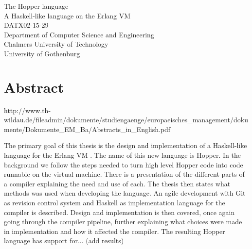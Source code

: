 The Hopper language\\
A Haskell-like language on the Erlang VM\\
DATX02-15-29\\
Department of Computer Science and Engineering\\
Chalmers University of Technology\\
University of Gothenburg\\

\thispagestyle{plain}			%
\section*{Abstract}



http://www.th-wildau.de/fileadmin/dokumente/studiengaenge/europaeisches_management/dokumente/Dokumente_EM_Ba/Abstracts_in_English.pdf






The primary goal of this thesis is the design and implementation of a Haskell-like language for the Erlang VM . The name of this new language is Hopper.
In the background we follow the steps needed to turn high level Hopper code into code runnable on the virtual machine. There is a presentation of the different parts of a compiler explaining the need and use of each. The thesis then states what methods was used when developing the language. An agile development with Git as revision control system and Haskell as implementation language for the compiler is described. Design and implementation is then covered, once again going through the compiler pipeline, further explaining what choices were made in implementation and how it affected the compiler.
The resulting Hopper language has support for... (add results)





